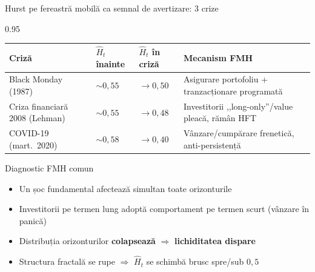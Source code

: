 \documentclass[9pt, aspectratio=169, t]{beamer}
\begin{document}
\begin{frame}[shrink=15]{Hurst pe fereastră mobilă ca semnal de avertizare: 3 crize}
\begin{cminipage}{0.95\textwidth}
\renewcommand{\arraystretch}{1.2}
\centering
\small
\begin{tabular}{llll}
\toprule
\textbf{Criză} & \textbf{$\hat H_t$ înainte} & \textbf{$\hat H_t$ în criză} & \textbf{Mecanism FMH} \\
\midrule
Black Monday (1987) & $\sim 0{,}55$ & $\to 0{,}50$ & Asigurare portofoliu + tranzacționare programată \\
Criza financiară 2008 (Lehman) & $\sim 0{,}55$ & $\to 0{,}48$ & Investitorii ,,long-only''/value pleacă, rămân HFT \\
COVID-19 (mart.\ 2020) & $\sim 0{,}58$ & $\to 0{,}40$ & Vânzare/cumpărare frenetică, anti-persistență \\
\bottomrule
\end{tabular}
\vspace{0.2cm}
\begin{block}{Diagnostic FMH comun}
\begin{itemize}\setlength{\itemsep}{0pt}
    \item Un șoc fundamental afectează simultan toate orizonturile
    \item Investitorii pe termen lung adoptă comportament pe termen scurt (vânzare în panică)
    \item Distribuția orizonturilor \textbf{colapsează} $\Rightarrow$ \textbf{lichiditatea dispare}
    \item Structura fractală se rupe $\Rightarrow$ $\hat H_t$ se schimbă brusc spre/sub $0{,}5$
\end{itemize}
\end{block}
\end{cminipage}
\end{frame}
\end{document}
